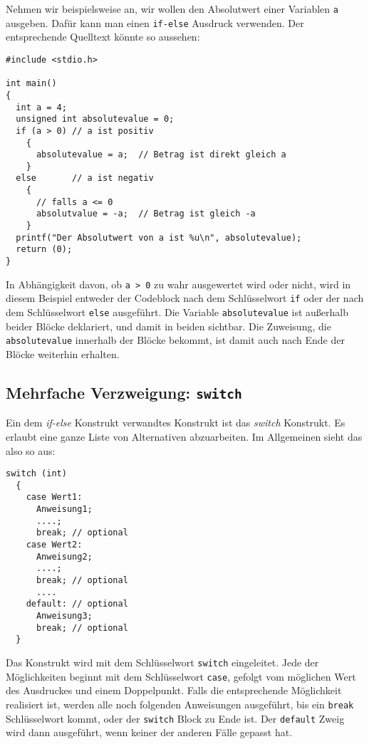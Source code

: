 Nehmen wir beispielsweise an, wir wollen den Absolutwert einer Variablen \verb|a| ausgeben.
Dafür kann man einen \verb|if-else| Ausdruck verwenden.
Der entsprechende Quelltext könnte so aussehen:
\begin{lstlisting}
#include <stdio.h>

int main()
{
  int a = 4;
  unsigned int absolutevalue = 0;
  if (a > 0) // a ist positiv
    {
      absolutevalue = a;  // Betrag ist direkt gleich a 
    }
  else       // a ist negativ
    {
      // falls a <= 0
      absolutvalue = -a;  // Betrag ist gleich -a
    }
  printf("Der Absolutwert von a ist %u\n", absolutevalue);
  return (0);
}
\end{lstlisting}
In Abhängigkeit davon, ob \verb|a > 0| zu wahr ausgewertet wird oder nicht, wird in diesem Beispiel entweder der Codeblock nach dem Schlüsselwort \verb|if| oder der nach dem Schlüsselwort \verb|else| ausgeführt.
Die Variable \verb|absolutevalue| ist außerhalb beider Blöcke deklariert, und damit in beiden sichtbar.
Die Zuweisung, die \verb|absolutevalue| innerhalb der Blöcke bekommt, ist damit auch nach Ende der Blöcke weiterhin erhalten.

\subsection{Mehrfache Verzweigung: \texttt{switch}}
 
Ein dem \emph{if-else} Konstrukt verwandtes Konstrukt ist das \emph{switch} Konstrukt.
Es erlaubt eine ganze Liste von Alternativen abzuarbeiten.
Im Allgemeinen sieht das also so aus:
\begin{lstlisting}[caption={switch statement}, belowcaptionskip=0.3em]
switch (int)
  {
    case Wert1:
      Anweisung1;
      ....;
      break; // optional
    case Wert2:
      Anweisung2;
      ....;
      break; // optional
      ....
    default: // optional
      Anweisung3;
      break; // optional
  }
\end{lstlisting}
Das Konstrukt wird mit dem Schlüsselwort \verb|switch| eingeleitet.
Jede der Möglichkeiten beginnt mit dem Schlüsselwort \verb|case|, gefolgt vom möglichen Wert des Ausdruckes und einem Doppelpunkt. 
Falls die entsprechende Möglichkeit realisiert ist, werden alle noch folgenden Anweisungen ausgeführt, bis ein \verb|break| Schlüsselwort kommt, oder der \verb|switch| Block zu Ende ist.
Der \verb|default| Zweig wird dann ausgeführt, wenn keiner der anderen Fälle gepasst hat.

